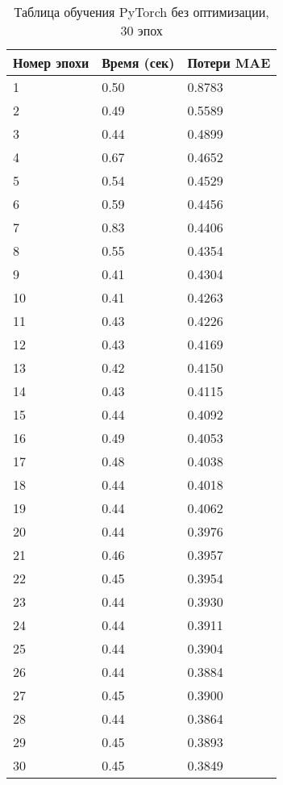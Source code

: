 \documentclass[a4paper,12pt,titlepage,final]{article}
\begin{document}
\begin{table}[H]
\centering
\begin{tabular}{|p{6.4cm}|p{3.2cm}|p{3.2cm}|}
\hline
Номер эпохи & Время (сек) & Потери MAE \\
\hline
1 & 0.50 & 0.8783 \\ [1.5ex]
\hline
2 & 0.49 & 0.5589 \\ [1.5ex]
\hline
3 & 0.44 & 0.4899 \\ [1.5ex]
\hline
4 & 0.67 & 0.4652 \\ [1.5ex]
\hline
5 & 0.54 & 0.4529 \\ [1.5ex]
\hline
6 & 0.59 & 0.4456 \\ [1.5ex]
\hline
7 & 0.83 & 0.4406 \\ [1.5ex]
\hline
8 & 0.55 & 0.4354 \\ [1.5ex]
\hline
9 & 0.41 & 0.4304 \\ [1.5ex]
\hline
10 & 0.41 & 0.4263 \\ [1.5ex]
\hline
11 & 0.43 & 0.4226 \\ [1.5ex]
\hline
12 & 0.43 & 0.4169 \\ [1.5ex]
\hline
13 & 0.42 & 0.4150 \\ [1.5ex]
\hline
14 & 0.43 & 0.4115 \\ [1.5ex]
\hline
15 & 0.44 & 0.4092 \\ [1.5ex]
\hline
16 & 0.49 & 0.4053 \\ [1.5ex]
\hline
17 & 0.48 & 0.4038 \\ [1.5ex]
\hline
18 & 0.44 & 0.4018 \\ [1.5ex]
\hline
19 & 0.44 & 0.4062 \\ [1.5ex]
\hline
20 & 0.44 & 0.3976 \\ [1.5ex]
\hline
21 & 0.46 & 0.3957 \\ [1.5ex]
\hline
22 & 0.45 & 0.3954 \\ [1.5ex]
\hline
23 & 0.44 & 0.3930 \\ [1.5ex]
\hline
24 & 0.44 & 0.3911 \\ [1.5ex]
\hline
25 & 0.44 & 0.3904 \\ [1.5ex]
\hline
26 & 0.44 & 0.3884 \\ [1.5ex]
\hline
27 & 0.45 & 0.3900 \\ [1.5ex]
\hline
28 & 0.44 & 0.3864 \\ [1.5ex]
\hline
29 & 0.45 & 0.3893 \\ [1.5ex]
\hline
30 & 0.45 & 0.3849 \\ [1.5ex]
\hline
\end{tabular}
\caption{Таблица обучения PyTorch без оптимизации, 30 эпох}
\label{table9}
\end{table}
\end{document}
